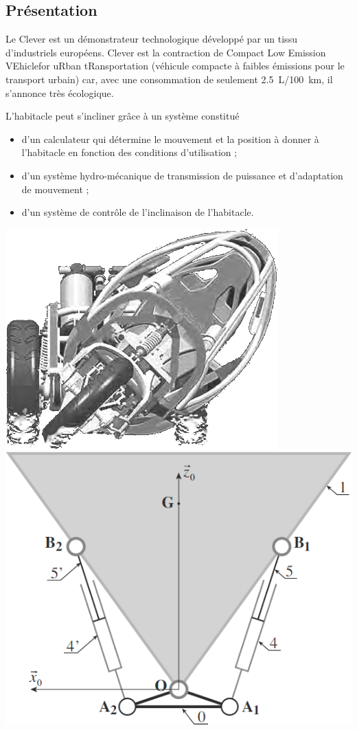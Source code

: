\ifprof
\begin{multicols}{2}
\else
\begin{multicols}{2}
\fi
\subsection*{Présentation}

Le Clever est un démonstrateur technologique développé par un tissu d'industriels européens. Clever est la contraction de Compact Low Emission VEhiclefor uRban tRansportation (véhicule compacte à faibles émissions pour le transport urbain) car, avec une consommation de seulement \SI{2,5}{L}/\SI{100}{km}, il s'annonce très écologique. 

L'habitacle peut s'incliner grâce à un système constitué 
\begin{itemize}
\item d'un calculateur qui détermine le mouvement et la position à donner à l'habitacle en fonction des conditions d'utilisation ;
\item d'un système hydro-mécanique de transmission de puissance et d'adaptation de mouvement ;
\item d'un système de contrôle de l'inclinaison de l'habitacle.
\end{itemize}

\begin{center}
\includegraphics[width=.47\linewidth]{images/fig_02}
\includegraphics[width=.47\linewidth]{images/fig_03}
\end{center}


\end{multicols}
\end{multicols}
